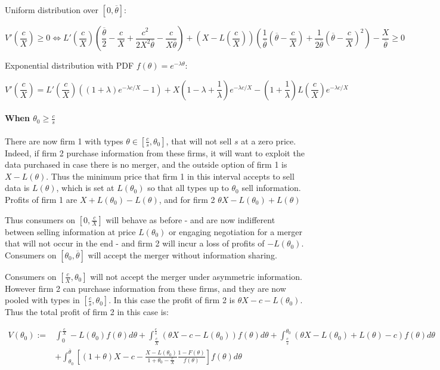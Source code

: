 \documentclass[a4paper]{article}
\renewcommand{\t}{\theta}
\renewcommand{\l}{\lambda}
\begin{document}
Uniform distribution over $[0,\overline \t]$:

\[
V'(\frac{c}{X})\geq0 \iff L'(\frac{c}{X})(\frac{\overline{\t}}{2}-\frac{c}{X}+\frac{c^2}{2X^2\overline \t}-\frac{c}{X\overline \t})+(X-L(\frac{c}{X}))(\frac{1}{\overline \t}(\overline{\t}-\frac{c}{X})+\frac{1}{2\overline{\t}}(\overline{\t}-\frac{c}{X})^2)-\frac{X}{\overline{\t}}\geq0
\]

Exponential distribution with PDF $f(\t)=e^{-\l \t}$:


\[
V'(\frac{c}{X})= L'(\frac{c}{X})((1+\l)e^{-\l c/X}-1)+X(1-\l+\frac{1}{\l}) e^{-\l c/X}-(1+\frac{1}{\l})L(\frac{c}{X})e^{-\l c/X}
\]


\paragraph{When $\t_0\geq\frac{c}{s}$}


There are now firm 1 with types $\t\in[\frac{c}{s},\t_0]$, that will not sell $s$ at a zero price. Indeed, if firm 2 purchase information from these firms, it will want to exploit the data purchased in case there is no merger, and the outside option of firm 1 is $X-L(\t)$. Thus the minimum price that firm 1 in this interval accepts to sell data is $L(\t)$, which is set at $L(\t_0)$ so that all types up to $\t_0$ sell information. Profits of firm 1 are $X+L(\t_0)-L(\t)$, and for firm 2 $\t X-L(\t_0)+L(\t)$

Thus consumers on $[0,\frac{c}{X}]$ will behave as before - and are now indifferent between selling information at price $L(\t_0)$ or engaging negotiation for a merger that will not occur in the end - and firm 2 will incur a loss of profits of $-L(\t_0)$. Consumers on $[\t_0,\overline \t]$ will accept the merger without information sharing.

Consumers on $[\frac{c}{X},\t_0]$ will not accept the merger under asymmetric information. However firm 2 can purchase information from these firms, and they are now pooled with types in $[\frac{c}{s},\t_0]$. In this case the profit of firm 2 is $\t X-c-L(\t_0)$. Thus the total profit of firm 2 in this case is:



\begin{equation}
\begin{aligned}
  V(\t_0):=&\int_0^{\frac{c}{X}} -L(\t_0)f(\t)d\t +\int_{\frac{c}{X}}^{\frac{c}{s}}(\t X-c-L(\t_0))f(\t)d\t+\int_{\frac{c}{s}}^{\t_0}(\t X-L(\t_0)+L(\t)-c)f(\t) d\t\\
  &+\int_{\t_0}^{\overline \t}\left[(1+\t)X-c-\frac{X-L(\t_0)}{1+\t_0-\frac{c}{X}}\frac{1-F(\t)}{f(\t)}\right]f(\t)d\t
\end{aligned}
\end{equation}
\end{document}
